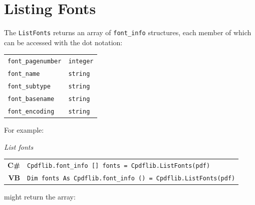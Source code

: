 \documentclass[a4paper]{memoir}
\begin{document}
\section{Listing Fonts}

The \verb!ListFonts! returns an array of \verb!font_info! structures, each member of which can be accessed with the dot notation:

\begin{framed}
\begin{tabular}{ll}
\verb!font_pagenumber! & \verb!integer!\\
\verb!font_name! & \verb!string!\\
\verb!font_subtype! & \verb!string!\\
\verb!font_basename! & \verb!string!\\
\verb!font_encoding! & \verb!string!\\
\end{tabular}
\end{framed}

For example:

\begin{framed}
\noindent\textit{List fonts}

\vspace{2mm}
\noindent\begin{tabular}{rl}
\small\sffamily\textbf{C\#} &
\begin{minipage}{4in}
\small\verb!Cpdflib.font_info [] fonts = Cpdflib.ListFonts(pdf)!
\end{minipage}\\[5mm]
\small\sffamily\textbf{VB} &
\begin{minipage}{4in}
\small\verb!Dim fonts As Cpdflib.font_info () = Cpdflib.ListFonts(pdf)!
\end{minipage}\\[5mm]
\end{tabular}
\end{framed}

might return the array:
\end{document}

